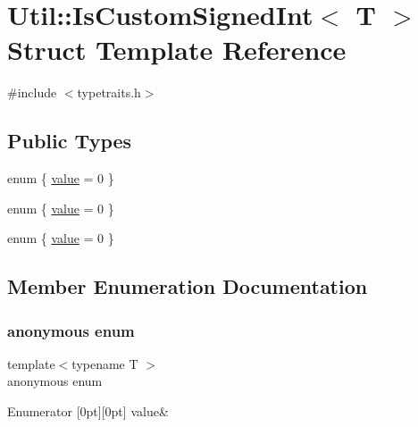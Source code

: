 \hypertarget{structUtil_1_1IsCustomSignedInt}{}\section{Util\+:\+:Is\+Custom\+Signed\+Int$<$ T $>$ Struct Template Reference}
\label{structUtil_1_1IsCustomSignedInt}


{\ttfamily \#include $<$typetraits.\+h$>$}

\subsection*{Public Types}
\begin{DoxyCompactItemize}
\item 
enum \{ \mbox{\hyperlink{structUtil_1_1IsCustomSignedInt_ac19ec79156218efdb321a3b2d1bfabd7a74e59dedda69b8eac87a3962dc062774}{value}} = 0
 \}
\item 
enum \{ \mbox{\hyperlink{structUtil_1_1IsCustomSignedInt_ac19ec79156218efdb321a3b2d1bfabd7a74e59dedda69b8eac87a3962dc062774}{value}} = 0
 \}
\item 
enum \{ \mbox{\hyperlink{structUtil_1_1IsCustomSignedInt_ac19ec79156218efdb321a3b2d1bfabd7a74e59dedda69b8eac87a3962dc062774}{value}} = 0
 \}
\end{DoxyCompactItemize}


\subsection{Member Enumeration Documentation}
\mbox{\label{structUtil_1_1IsCustomSignedInt_a28c4e4c118a6163a6772030ec9f767ce}} 
\subsubsection{\texorpdfstring{anonymous enum}{anonymous enum}}
{\footnotesize\ttfamily template$<$typename T $>$ \\
anonymous enum}

\begin{DoxyEnumFields}{Enumerator}
[0pt][0pt]{}\mbox{\label{structUtil_1_1IsCustomSignedInt_ac19ec79156218efdb321a3b2d1bfabd7a74e59dedda69b8eac87a3962dc062774}} 
value&\\
\hline

\end{DoxyEnumFields}
\mbox{\label{structUtil_1_1IsCustomSignedInt_ac5c4706158727ee98b80c28042447712}} 
